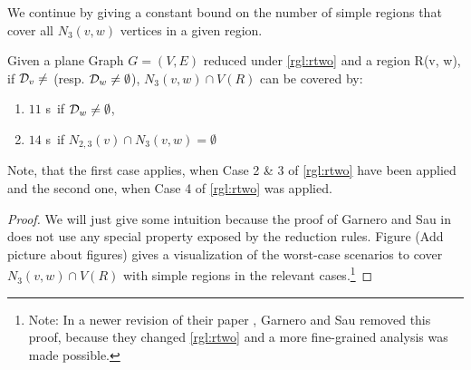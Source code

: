 We continue by giving a constant bound on the number of simple regions that cover all  $N_3(v,w)$ vertices in a given region.



\begin{lemma}\label{lemma:rtwosr}
    Given a plane Graph $G = (V,E)$ reduced under \cref{rgl:rtwo} and a region R(v, w), if $\mathcal{D}_{v} \neq $ (resp. $\mathcal{D}_{w} \neq \emptyset$), $N_3(v,w) \cap V(R)$ can be covered by: 
    \begin{enumerate}
        \item $11$ \sr s~if $\mathcal{D}_{w} \neq \emptyset$,
        \item $14$ \sr s~if $N_{2,3}(v) \cap N_3(v,w) = \emptyset$
    \end{enumerate}
\end{lemma}

Note, that the first case applies, when Case 2 \& 3 of \cref{rgl:rtwo} have been applied and the second one, when Case 4 of \cref{rgl:rtwo} was applied.
\begin{proof} 
    We will just give some intuition because the proof of Garnero and Sau in \cite[Fact 6]{Garnero2014} does not use any special property exposed by the reduction rules. Figure (Add picture about figures) gives a visualization of the worst-case scenarios to cover $N_3(v,w) \cap V(R)$ with simple regions in the relevant cases.\footnote{Note: In a newer revision of their paper \cite{Garnero2018}, Garnero and Sau removed this proof, because they changed \cref{rgl:rtwo} and a more fine-grained analysis was made possible.}
    
    
    
\end{proof}


